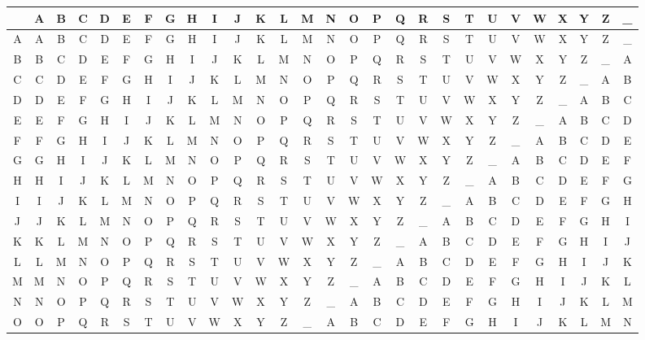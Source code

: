 \begin{table}[H]
  \center
  \setlength{\tabcolsep}{1pt}
  \begin{tabular}{c|ccccc ccccc ccccc ccccc ccccc cc}
    & A & B & C & D & E & F & G & H & I & J & K & L & M & N & O & P & Q & R & S & T & U & V & W & X & Y & Z & \_ \\
    \hline
    A & A & B & C & D & E & F & G & H & I & J & K & L & M & N & O & P & Q & R & S & T & U & V & W & X & Y & Z & \_ \\
    B & B & C & D & E & F & G & H & I & J & K & L & M & N & O & P & Q & R & S & T & U & V & W & X & Y & Z & \_ & A \\
    C & C & D & E & F & G & H & I & J & K & L & M & N & O & P & Q & R & S & T & U & V & W & X & Y & Z & \_ & A & B \\
    D & D & E & F & G & H & I & J & K & L & M & N & O & P & Q & R & S & T & U & V & W & X & Y & Z & \_ & A & B & C \\
    E & E & F & G & H & I & J & K & L & M & N & O & P & Q & R & S & T & U & V & W & X & Y & Z & \_ & A & B & C & D \\
    F & F & G & H & I & J & K & L & M & N & O & P & Q & R & S & T & U & V & W & X & Y & Z & \_ & A & B & C & D & E \\
    G & G & H & I & J & K & L & M & N & O & P & Q & R & S & T & U & V & W & X & Y & Z & \_ & A & B & C & D & E & F \\
    H & H & I & J & K & L & M & N & O & P & Q & R & S & T & U & V & W & X & Y & Z & \_ & A & B & C & D & E & F & G \\
    I & I & J & K & L & M & N & O & P & Q & R & S & T & U & V & W & X & Y & Z & \_ & A & B & C & D & E & F & G & H \\
    J & J & K & L & M & N & O & P & Q & R & S & T & U & V & W & X & Y & Z & \_ & A & B & C & D & E & F & G & H & I \\
    K & K & L & M & N & O & P & Q & R & S & T & U & V & W & X & Y & Z & \_ & A & B & C & D & E & F & G & H & I & J \\
    L & L & M & N & O & P & Q & R & S & T & U & V & W & X & Y & Z & \_ & A & B & C & D & E & F & G & H & I & J & K \\
    M & M & N & O & P & Q & R & S & T & U & V & W & X & Y & Z & \_ & A & B & C & D & E & F & G & H & I & J & K & L \\
    N & N & O & P & Q & R & S & T & U & V & W & X & Y & Z & \_ & A & B & C & D & E & F & G & H & I & J & K & L & M \\
    O & O & P & Q & R & S & T & U & V & W & X & Y & Z & \_ & A & B & C & D & E & F & G & H & I & J & K & L & M & N \\

\end{tabular}
\end{table}
